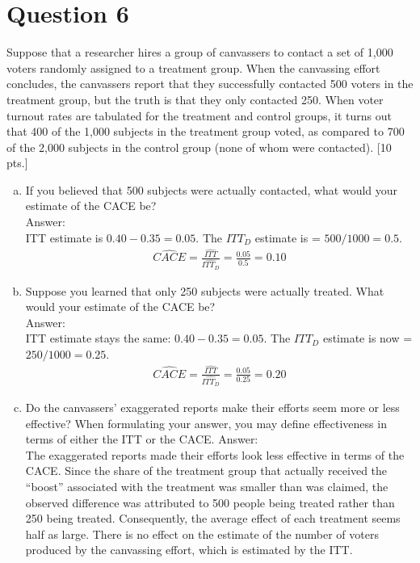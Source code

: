 \documentclass[11pt,notitlepage]{article}\usepackage[]{graphicx}\usepackage[]{color}
\begin{document}
\section*{Question 6}
Suppose that a researcher hires a group of canvassers to contact a set of 1,000 voters randomly assigned to a treatment group. When the canvassing effort concludes, the canvassers report that they successfully contacted 500 voters in the treatment group, but the truth is that they only contacted 250. When voter turnout rates are tabulated for the treatment and control groups, it turns out that 400 of the 1,000 subjects in the treatment group voted, as compared to 700 of the 2,000 subjects in the control group (none of whom were contacted). [10 pts.] 
\begin{enumerate}[a)]
\item If you believed that 500 subjects were actually contacted, what would your estimate of the CACE be?\\
Answer:\\
ITT estimate is $0.40 - 0.35 = 0.05$. The $ITT_D$ estimate is = $500/1000 = 0.5$.
\begin{align*}
\widehat{CACE}= \frac{\widehat{ITT}}{\widehat{ITT_D}} = \frac{0.05}{0.5} = 0.10
\end{align*}
\item Suppose you learned that only 250 subjects were actually treated. What would your estimate of the CACE be?\\
Answer:\\
ITT estimate stays the same: $0.40 - 0.35 = 0.05$. The $ITT_D$ estimate is now = $250/1000 = 0.25$.
\begin{align*}
\widehat{CACE}= \frac{\widehat{ITT}}{\widehat{ITT_D}} = \frac{0.05}{0.25} = 0.20
\end{align*}
\item Do the canvassers' exaggerated reports make their efforts seem more or less effective?  When formulating your answer, you may define effectiveness in terms of either the ITT or the CACE.
Answer:\\
The exaggerated reports made their efforts look less effective in terms of the CACE. Since the share of the treatment group that actually received the ``boost'' associated with the treatment was smaller than was claimed, the observed difference was attributed to 500 people being treated rather than 250 being treated. Consequently, the average effect of each treatment seems half as large. There is no effect on the estimate of the number of voters produced by the canvassing effort, which is estimated by the ITT.
\end{enumerate}
\end{document}
